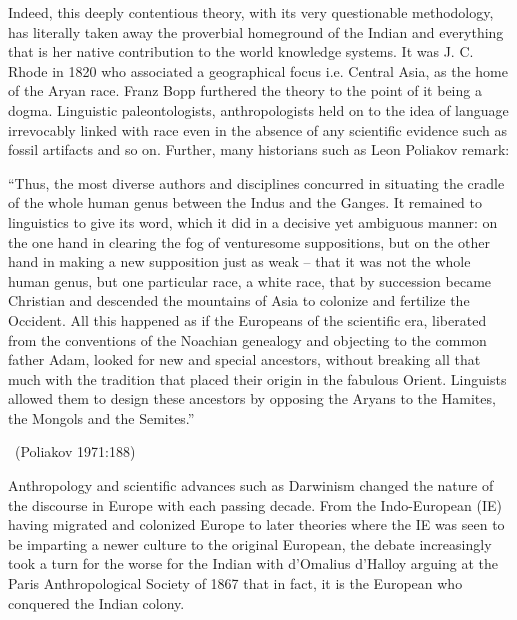 \newpage

Indeed, this deeply contentious theory, with its very questionable methodology, has literally taken away the proverbial homeground of the Indian and everything that is her native contribution to the world knowledge systems. It was J. C. Rhode in 1820 who associated a geographical focus i.e. Central Asia, as the home of the Aryan race. Franz Bopp furthered the theory to the point of it being a dogma. Linguistic paleontologists, anthropologists held on to the idea of language irrevocably linked with race even in the absence of any scientific evidence such as fossil artifacts and so on. Further, many historians such as Leon Poliakov remark:

\begin{myquote}
“Thus, the most diverse authors and disciplines concurred in situating the cradle of the whole human genus between the Indus and the Ganges. It remained to linguistics to give its word, which it did in a decisive yet ambiguous manner: on the one hand in clearing the fog of venturesome suppositions, but on the other hand in making a new supposition just as weak -- that it was not the whole human genus, but one particular race, a white race, that by succession became Christian and descended the mountains of Asia to colonize and fertilize the Occident. All this happened as if the Europeans of the scientific era, liberated from the conventions of the Noachian genealogy and objecting to the common father Adam, looked for new and special ancestors, without breaking all that much with the tradition that placed their origin in the fabulous Orient. Linguists allowed them to design these ancestors by opposing the Aryans to the Hamites, the Mongols and the Semites.”

~\hfill (Poliakov 1971:188)
\end{myquote}

Anthropology and scientific advances such as Darwinism changed the nature of the discourse in Europe with each passing decade. From the Indo-European (IE) having migrated and colonized Europe to later theories where the IE was seen to be imparting a newer culture to the original European, the debate increasingly took a turn for the worse for the Indian with d'Omalius d'Halloy arguing at the Paris Anthropological Society of 1867 that in fact, it is the European who conquered the Indian colony.

